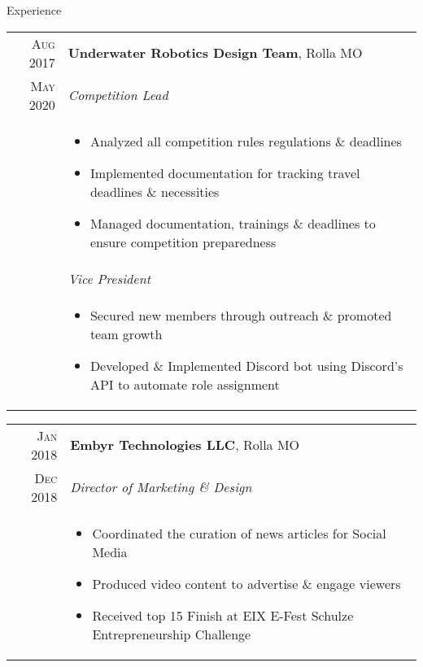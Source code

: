 \documentclass{resume}
\begin{document}
\begin{rSection}{Experience}
{    \begin{tabular}{r|p{15cm}}
        \textsc{Aug 2017} & \textbf{Underwater Robotics Design Team}, Rolla MO \\
        \textsc{May 2020}  & \textit{Competition Lead} \\ &
        \begin{itemize}
            \item {Analyzed all competition rules regulations \& deadlines}
            \item {Implemented documentation for tracking travel deadlines \& necessities}
            \item {Managed documentation, trainings \& deadlines to ensure competition preparedness}
        \end{itemize}\\ &
        \textit{Vice President} \\ &
        \begin{itemize}
            \item {Secured new members through outreach \& promoted team growth}
            \item {Developed \& Implemented Discord bot using Discord's API to automate role assignment}
        \end{itemize}
    \end{tabular}

    \begin{tabular}{r|p{15cm}}
        \textsc{Jan 2018} & \textbf{Embyr Technologies LLC}, Rolla MO \\
        \textsc{Dec 2018}  & \textit{Director of Marketing \& Design} \\ &
        \begin{itemize}
            \item {Coordinated the curation of news articles for Social Media}
            \item {Produced video content to advertise \& engage viewers}
            \item {Received top 15 Finish at EIX E-Fest Schulze Entrepreneurship Challenge}
        \end{itemize}
    \end{tabular}
}
\end{rSection}
\end{document}
